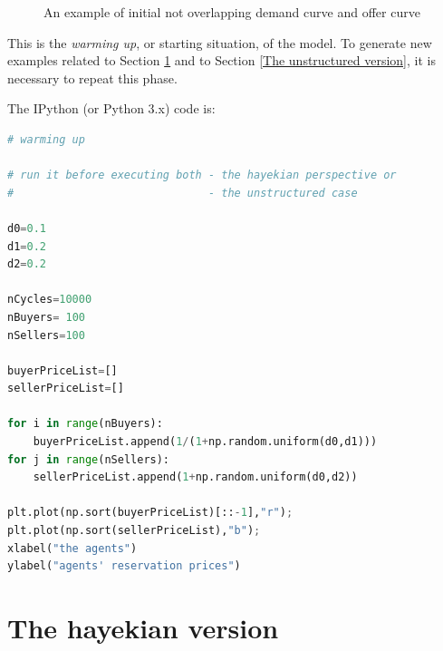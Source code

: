 \documentclass[12pt]{report}
\begin{document}
\begin{figure}[htbp]
\begin{center}
\caption{An example of initial not overlapping demand curve and offer curve}
\label{output_2_1.png}
\end{center}
\end{figure}

This is the \emph{warming up}, or starting situation, of the model. To generate new examples related to Section \ref{The hayekian version} and to Section \ref{The unstructured version}, it is necessary to repeat this phase.

The IPython (or Python 3.x) code is:

\begin{lstlisting}[language=Python, caption=Warming up of the model, basicstyle=\ttfamily\footnotesize]
# warming up

# run it before executing both - the hayekian perspective or
#                              - the unstructured case

d0=0.1
d1=0.2
d2=0.2

nCycles=10000
nBuyers= 100
nSellers=100

buyerPriceList=[]
sellerPriceList=[]

for i in range(nBuyers):
    buyerPriceList.append(1/(1+np.random.uniform(d0,d1)))
for j in range(nSellers):
    sellerPriceList.append(1+np.random.uniform(d0,d2))
    
plt.plot(np.sort(buyerPriceList)[::-1],"r");
plt.plot(np.sort(sellerPriceList),"b");
xlabel("the agents")
ylabel("agents' reservation prices")
\end{lstlisting}

\section{The hayekian version}\label{The hayekian version}
 
\end{document}
